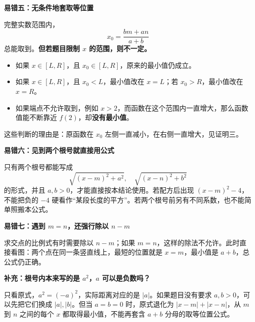\begin{trapbox}
\textbf{\textcolor{CTrap}{易错五：无条件地套取等位置}}

完整实数范围内，
\[
 x_0=\frac{bm+an}{a+b}
\]
总能取到。\textbf{但若题目限制 $x$ 的范围，则不一定。}

\begin{itemize}[leftmargin=*,itemsep=.3em]
\item 如果 $x\in[L,R]$，且 $x_0\in[L,R]$，原来的最小值仍成立。
\item 如果 $x\in[L,R]$，且 $x_0<L$，最小值改在 $x=L$；若 $x_0>R$，最小值改在 $x=R$。
\item 如果端点不允许取到，例如 $x>2$，而函数在这个范围内一直增大，那么函数值能不断靠近 $f(2)$，却\textbf{没有最小值}。
\end{itemize}

这些判断的理由是：原函数在 $x_0$ 左侧一直减小，在右侧一直增大，见证明三。

\medskip
\textbf{\textcolor{CTrap}{易错六：见到两个根号就直接用公式}}

只有两个根号都能写成
\[
 \sqrt{(x-m)^2+a^2},\quad\sqrt{(x-n)^2+b^2}
\]
的形式，并且 $a,b>0$，才能直接按本结论使用。若配方后出现 $(x-m)^2-4$，不能把负的 $-4$ 硬看作“某段长度的平方”。若两个根号前另有不同系数，也不能简单照搬本公式。

\medskip
\textbf{\textcolor{CTrap}{易错七：遇到 $m=n$，还强行除以 $n-m$}}

求交点的比例式有时需要除以 $n-m$；如果 $m=n$，这样的除法不允许。此时直接看图：两个点在同一条竖直线上，最短的位置就是 $x=m$，最小值是 $a+b$，总公式仍正确。

\medskip
\end{trapbox}
\clearpage
\begin{trapbox}
\textbf{\textcolor{CTrap}{补充：根号内本来写的是 $a^2$，$a$ 可以是负数吗？}}



只看原式，$a^2=(-a)^2$，实际距离对应的是 $|a|$。如果题目没有要求 $a,b>0$，可以先把它们换成 $|a|,|b|$。但当 $a=b=0$ 时，原式退化为 $|x-m|+|x-n|$，从 $m$ 到 $n$ 之间的每个 $x$ 都取得最小值，不能再套含 $a+b$ 分母的取等位置公式。
\end{trapbox}
